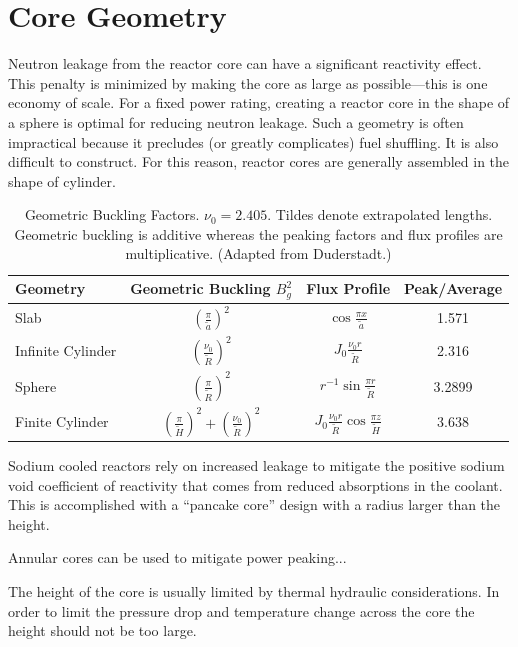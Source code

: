 \section{Core Geometry}
Neutron leakage from the reactor core can have a significant reactivity effect.
This penalty is minimized by making the core as large as possible---this is one economy of scale. For a fixed power rating, creating a reactor core in the shape of a sphere is optimal for reducing neutron leakage.
Such a geometry is often impractical because it precludes (or greatly complicates) fuel shuffling. It is also difficult to construct.
For this reason, reactor cores are generally assembled in the shape of cylinder.

\begin{table}
\centering
\large
\caption{Geometric Buckling Factors. $\nu_0=2.405$. Tildes denote extrapolated lengths. Geometric buckling is additive whereas the peaking factors and flux profiles are multiplicative. (Adapted from Duderstadt.)}
\begin{tabular}{lccc}
\hline
Geometry & Geometric Buckling $B_g^2$ & Flux Profile & Peak/Average \\
\hline
Slab & $\left( \frac{\pi}{\tilde{a}} \right)^2$ & $\cos \frac{\pi x}{\tilde{a}}$ & 1.571\\
Infinite Cylinder & $\left( \frac{\nu _0}{\tilde{R}} \right)^2$ & $J_0 \frac{\nu_0 r}{\tilde{R}}$ & 2.316\\
Sphere & $\left( \frac{\pi}{\tilde{R}} \right)^2$ & $r^{-1}\sin \frac{\pi r}{\tilde{R}}$ & 3.2899\\ 
Finite Cylinder & $\left( \frac{\pi}{\tilde{H}} \right)^2 + \left( \frac{\nu _0}{\tilde{R}}
     \right)^2$    & $J_0 \frac{\nu_0 r}{\tilde{R}} \cos \frac{\pi z}{\tilde{H}}$ & 3.638\\
\hline

\end{tabular}
\end{table}

Sodium cooled reactors rely on increased leakage to mitigate the positive sodium void coefficient of reactivity that comes from reduced absorptions in the coolant.
This is accomplished with a ``pancake core'' design with a radius larger than the height.


Annular cores can be used to mitigate power peaking...

The height of the core is usually limited by thermal hydraulic considerations. 
In order to limit the pressure drop and temperature change across the core the height should not be too large.



\begingroup
\let\cleardoublepage\clearpage




\endgroup
